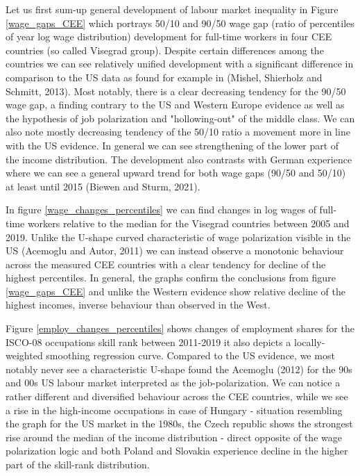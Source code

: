 \documentclass{article}
\begin{document}
Let us first sum-up general development of labour market inequality in Figure \ref{wage_gaps_CEE} which portrays 50/10 and 90/50 wage gap (ratio of percentiles of year log wage distribution) development for full-time workers in four CEE countries (so called Visegrad group). Despite certain differences among the countries we can see relatively unified development with a significant difference in comparison to the US data as found for example in (Mishel, Shierholz and Schmitt, 2013). Most notably, there is a clear decreasing tendency for the 90/50 wage gap, a finding contrary to the US and Western Europe evidence as well as the hypothesis of job polarization and "hollowing-out" of the middle class. We can also note mostly decreasing tendency of the 50/10 ratio a movement more in line with the US evidence. In general we can see strengthening of the lower part of the income distribution. The development also contrasts with German experience where we can see a general upward trend for both wage gaps (90/50 and 50/10) at least until 2015 (Biewen and Sturm, 2021).

In figure \ref{wage_changes_percentiles} we can find changes in log wages of full-time workers relative to the median for the Visegrad countries between 2005 and 2019. Unlike the U-shape curved characteristic of wage polarization visible in the US (Acemoglu and Autor, 2011) we can instead observe a monotonic behaviour across the measured CEE countries with a clear tendency for decline of the highest percentiles. In general, the graphs confirm the conclusions from figure \ref{wage_gaps_CEE} and unlike the Western evidence show relative decline of the highest incomes, inverse behaviour than observed in the West.

Figure \ref{employ_changes_percentiles} shows changes of employment shares for the ISCO-08 occupations skill rank between 2011-2019 it also depicts a locally-weighted smoothing regression curve. Compared to the US evidence, we most notably never see a characteristic U-shape found the Acemoglu (2012) for the 90s and 00s US labour market interpreted as the job-polarization. We can notice a rather different and diversified behaviour across the CEE countries, while we see a rise in the high-income occupations in case of Hungary - situation resembling the graph for the US market in the 1980s, the Czech republic shows the strongest rise around the median of the income distribution - direct opposite of the wage polarization logic and both Poland and Slovakia experience decline in the higher part of the skill-rank distribution.
\end{document}
